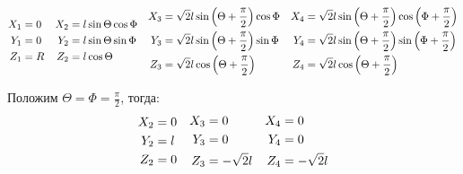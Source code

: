 \documentclass[12pt]{article}
\newcommand{\lb}{\left(}
\newcommand{\rb}{\right)}
\begin{document}
\begin{gather}
	\begin{aligned}
			X_1 &= 0 \\
			Y_1 &= 0 \\
			Z_1 &= R \\
	\end{aligned}
	\quad
	\begin{aligned}
			X_2 &= l \sin \Theta \cos \Phi \\
			Y_2 &= l \sin \Theta \sin \Phi \\
			Z_2 &= l \cos \Theta 
	\end{aligned}
	\quad 	
	\begin{aligned}
			X_3 &= \sqrt{2} l \sin \lb \Theta + \frac{\pi}{2} \rb \cos \Phi \\
			Y_3 &= \sqrt{2} l \sin \lb \Theta + \frac{\pi}{2} \rb \sin \Phi \\
			Z_3 &= \sqrt{2} l \cos \lb \Theta + \frac{\pi}{2} \rb 
	\end{aligned}
	\quad
	\begin{aligned}
			X_4 &= \sqrt{2} l \sin \lb \Theta + \frac{\pi}{2} \rb \cos \lb \Phi + \frac{\pi}{2} \rb \\
			Y_4 &= \sqrt{2} l \sin \lb \Theta + \frac{\pi}{2} \rb \sin \lb \Phi + \frac{\pi}{2} \rb \\
		Z_4 &= \sqrt{2} l \cos \lb \Theta + \frac{\pi}{2} \rb
	\end{aligned} \notag
\end{gather}

Положим $\Theta = \Phi = \displaystyle \frac{\pi}{2}$, тогда:
\begin{gather}
	\begin{aligned}
		X_2 &= 0 \\
		Y_2 &= l \\
		Z_2 &= 0 
	\end{aligned}
	\quad
	\begin{aligned}
		X_3 &= 0 \\
		Y_3 &= 0 \\
		Z_3 &= - \sqrt{2} l
	\end{aligned}
	\quad
	\begin{aligned}
		X_4 &= 0 \\
		Y_4 &= 0 \\
		Z_4 &= - \sqrt{2} l
	\end{aligned} \notag
\end{gather}
\end{document}
